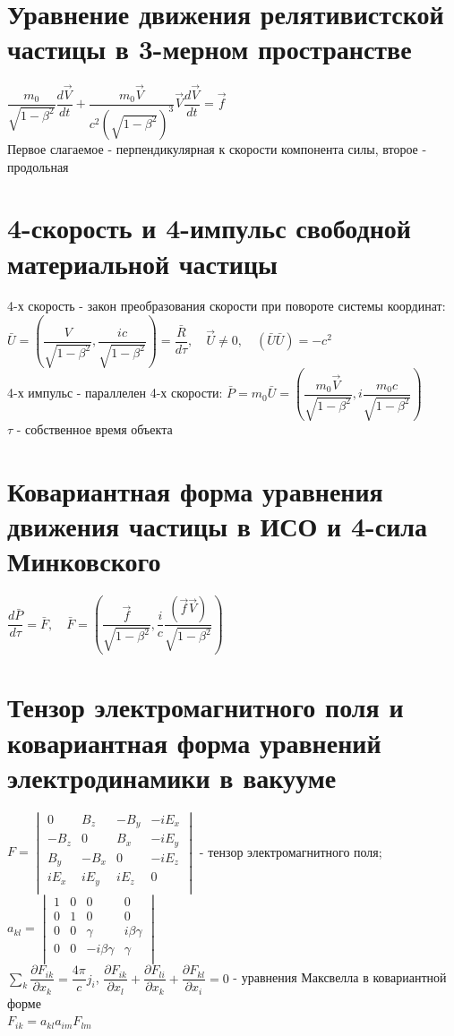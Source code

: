 \begin{multicols*}{2}
		\section{Уравнение движения релятивистской частицы в 3-мерном пространстве}
		$\dfrac{m_0}{\sqrt{1-\beta^2}}\dfrac{d\vec{V}}{dt} + \dfrac{m_0 \vec{V}}{c^2(\sqrt{1-\beta^2})^3}\vec{V} \dfrac{d\vec{V}}{dt} = \vec{f}$\\
		Первое слагаемое - перпендикулярная к скорости компонента силы, второе - продольная
		
		\section{4-скорость и 4-импульс свободной материальной частицы}
		4-х скорость - закон преобразования скорости при повороте системы координат:\\
		$\bar{U} = (\dfrac{V}{\sqrt{1-\beta^2}}, \dfrac{ic}{\sqrt{1-\beta^2}}) = \dfrac{\bar{R}}{d\tau}, \quad \vec{U} \neq 0,\quad (\bar{U}\bar{U}) = -c^2$\\
		4-х импульс - параллелен 4-х скорости: $\bar{P} = m_0\bar{U} = (\dfrac{m_0\vec{V}}{\sqrt{1-\beta^2}}, i\dfrac{m_0c}{\sqrt{1-\beta^2}})$\\
		$\tau$ - собственное время объекта
		
		\section{Ковариантная форма уравнения движения частицы в ИСО и 4-сила Минковского}
		$\dfrac{d\bar{P}}{d\tau} = \bar{F},\quad \bar{F} = (\dfrac{\vec{f}}{\sqrt{1-\beta^2}}, \dfrac{i}{c}\dfrac{(\vec{f}\vec{V})}{\sqrt{1-\beta^2}})$
		
		\section{Тензор электромагнитного поля и ковариантная форма уравнений электродинамики в вакууме}
		$F = \begin{vmatrix}
			0& B_{z}& -B_{y}& -iE_x\\
			-B_{z}& 0& B_{x}& -iE_y\\
			B_{y}& -B_{x}& 0& -iE_z\\
			iE_x& iE_y& iE_z& 0 \\
		\end{vmatrix}$ - тензор электромагнитного поля;~~
		$a_{kl} = \begin{vmatrix}
			1& 0& 0& 0\\
			0& 1& 0& 0\\
			0& 0& \gamma & i\beta \gamma \\
			0& 0& -i\beta \gamma& \gamma  \\
		\end{vmatrix}$\\
		$\sum_{k}^{} \dfrac{\partial F_{ik}}{\partial x_k} = \dfrac{4\pi}{c}j_i$, \quad $\dfrac{\partial F_{ik}}{\partial x_l} + \dfrac{\partial F_{li}}{\partial x_k} + \dfrac{\partial F_{kl}}{\partial x_i} = 0$ - уравнения Максвелла в ковариантной форме\\
		$F_{ik} = a_{kl} a_{im} F_{lm}$
		

\end{multicols*}
